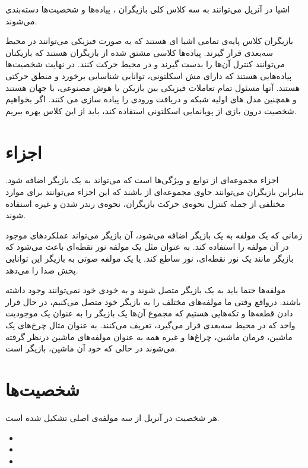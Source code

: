اشیا در آنریل می‌توانند به سه کلاس کلی بازیگران
، پیاده‌ها 
و شخصیت‌ها
دسته‌بندی می‌شوند.

بازیگران کلاس پایه‌ی تمامی اشیا ای هستند که به صورت فیزیکی می‌توانند در محیط سه‌بعدی قرار گیرند.
پیاده‌ها کلاسی مشتق شده از بازیگران هستند که بازیکنان می‌توانند کنترل آن‌ها را بدست گیرند و 
در محیط حرکت کنند.
 در نهایت شخصیت‌ها پیاده‌هایی هستند که دارای مش اسکلتونی، توانایی شناسایی برخورد و منطق حرکتی هستند.
 آنها مسئول تمام تعاملات فیزیکی بین بازیکن یا هوش مصنوعی، با جهان هستند و همچنین مدل های اولیه شبکه و دریافت ورودی را پیاده سازی می کنند. 
اگر بخواهیم شخصیت درون بازی از پویانمایی اسکلتونی استفاده کند، باید از این کلاس بهره ببریم.

\section{اجزاء}

اجزاء
مجموعه‌ای از توابع و ویژگی‌ها است که می‌تواند به یک بازیگر اضافه شود.
بنابراین بازیگران می‌توانند حاوی مجموعه‌ای از
باشند که این اجزاء می‌توانند برای موارد مختلفی از جمله
کنترل نحوه‌ی حرکت بازیگران، 
نحوه‌ی رندر شدن و غیره استفاده شوند.

زمانی که یک مولفه به یک بازیگر اضافه می‌شود، آن بازیگر می‌تواند عملکرد‌های موجود در آن مولفه را استفاده کند.
به عنوان مثل یک مولفه نور نقطه‌ای باعث می‌شود که بازیگر مانند یک نور نقطه‌ای، نور ساطع کند.
یا یک مولفه صوتی به بازیگر این توانایی پخش صدا را می‌دهد.

مولفه‌ها حتما باید به یک بازیگر متصل شوند و به خودی خود نمی‌توانند وجود داشته باشند.
درواقع وقتی ما مولفه‌های مختلف را به بازیگر خود متصل می‌کنیم، در حال قرار دادن قطعه‌ها و تکه‌هایی هستیم
 که مجموع آن‌ها یک بازیگر را به عنوان یک موجودیت واحد که در محیط سه‌بعدی قرار می‌گیرد، تعریف می‌کنند.
 به عنوان مثال چرخ‌های یک ماشین، فرمان ماشین، چراغ‌ها و غیره همه به عنوان
 مولفه‌های ماشین درنظر گرفته می‌شوند در حالی که خود آن ماشین، بازیگر است.

\section{شخصیت‌ها}

هر شخصیت در آنریل از سه مولفه‌ی اصلی تشکیل شده است.


\begin{itemize}
	\item {}
	\item {}
	\item {}
\end{itemize}


